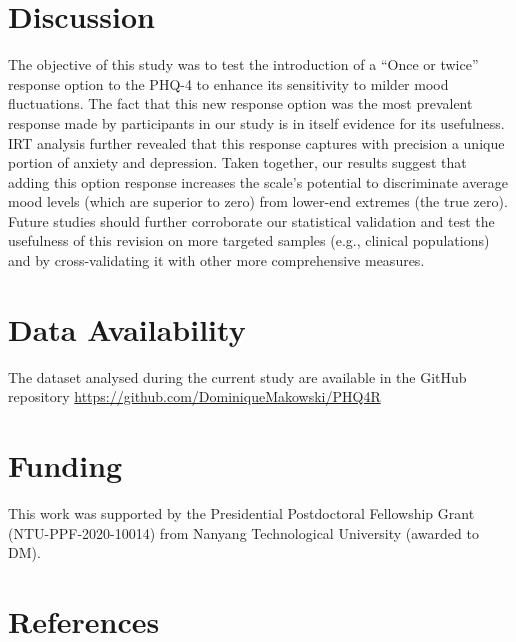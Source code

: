 \documentclass[
  man,floatsintext]{apa6}
\begin{document}
\hypertarget{discussion}{%
\section{Discussion}\label{discussion}}

The objective of this study was to test the introduction of a ``Once or twice'' response option to the PHQ-4 to enhance its sensitivity to milder mood fluctuations. The fact that this new response option was the most prevalent response made by participants in our study is in itself evidence for its usefulness. IRT analysis further revealed that this response captures with precision a unique portion of anxiety and depression. Taken together, our results suggest that adding this option response increases the scale's potential to discriminate average mood levels (which are superior to zero) from lower-end extremes (the true zero). Future studies should further corroborate our statistical validation and test the usefulness of this revision on more targeted samples (e.g., clinical populations) and by cross-validating it with other more comprehensive measures.

\hypertarget{data-availability}{%
\section{Data Availability}\label{data-availability}}

The dataset analysed during the current study are available in the GitHub repository \url{https://github.com/DominiqueMakowski/PHQ4R}

\hypertarget{funding}{%
\section{Funding}\label{funding}}

This work was supported by the Presidential Postdoctoral Fellowship Grant (NTU-PPF-2020-10014) from Nanyang Technological University (awarded to DM).

\newpage

\hypertarget{references}{%
\section{References}\label{references}}
\end{document}
